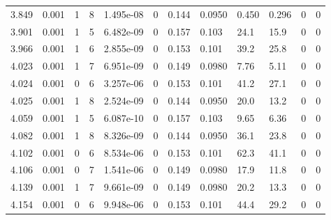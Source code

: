 \documentclass[preview]{standalone}
\begin{document}
{{{{\begin{tabular}{L{1.2cm}C{1.2cm} C{0.3cm}C{0.5cm} C{1.4cm}C{1.4cm} C{1.4cm}C{1.4cm} C{1.6cm}C{1.6cm} C{1.6cm}C{1.6cm}}
  3.849  &  0.001  & 1     &  8 &  1.495e-08  & 0  &  0.144&   0.0950& 0.450 & 0.296   &  0 & 0  \\ 
  3.901  &  0.001  & 1     &  5 &  6.482e-09  & 0  &  0.157&   0.103& 24.1 & 15.9   &  0 & 0  \\ 
  3.966  &  0.001  & 1     &  6 &  2.855e-09  & 0  &  0.153&   0.101& 39.2 & 25.8   &  0 & 0  \\ 
  4.023  &  0.001  & 1     &  7 &  6.951e-09  & 0  &  0.149&   0.0980& 7.76 & 5.11   &  0 & 0  \\ 
  4.024  &  0.001  & 0     &  6 &  3.257e-06  & 0  &  0.153&   0.101& 41.2 & 27.1   &  0 & 0  \\ 
  4.025  &  0.001  & 1     &  8 &  2.524e-09  & 0  &  0.144&   0.0950& 20.0 & 13.2   &  0 & 0  \\ 
  4.059  &  0.001  & 1     &  5 &  6.087e-10  & 0  &  0.157&   0.103& 9.65 & 6.36   &  0 & 0  \\ 
  4.082  &  0.001  & 1     &  8 &  8.326e-09  & 0  &  0.144&   0.0950& 36.1 & 23.8   &  0 & 0  \\ 
  4.102  &  0.001  & 0     &  6 &  8.534e-06  & 0  &  0.153&   0.101& 62.3 & 41.1   &  0 & 0  \\ 
  4.106  &  0.001  & 0     &  7 &  1.541e-06  & 0  &  0.149&   0.0980& 17.9 & 11.8   &  0 & 0  \\ 
  4.139  &  0.001  & 1     &  7 &  9.661e-09  & 0  &  0.149&   0.0980& 20.2 & 13.3   &  0 & 0  \\ 
  4.154  &  0.001  & 0     &  6 &  9.948e-06  & 0  &  0.153&   0.101& 44.4 & 29.2   &  0 & 0  \\ 
\hline 
\end{tabular} 

}}}}
\end{document}
